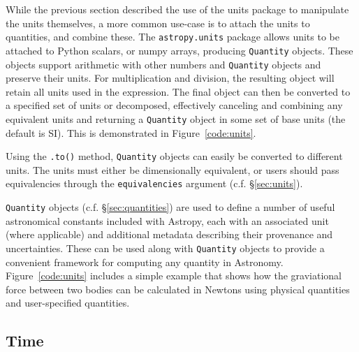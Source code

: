 \documentclass[traditabstract]{aa}
\begin{document}
\label{sec:quantities}

While the previous section described the use of the units package to
manipulate the units themselves, a more common use-case is to attach the units
to quantities, and combine these. The \texttt{astropy.units} package allows
units to be attached to Python scalars, or \gls{numpy} arrays, producing
\texttt{Quantity} objects. These objects support arithmetic with other numbers
and \texttt{Quantity} objects and preserve their units. For multiplication and
division, the resulting object will retain all units used in the expression.
The final object can then be converted to a specified set of units or
decomposed, effectively canceling and combining any equivalent units and
returning a \texttt{Quantity} object in some set of base units (the default is
SI). This is demonstrated in Figure~\ref{code:units}.

Using the \texttt{.to()} method, \texttt{Quantity} objects can easily be
converted to different units. The units must either be dimensionally
equivalent, or users should pass equivalencies through the
\texttt{equivalencies} argument (c.f. \S\ref{sec:units}).

\texttt{Quantity} objects (c.f. \S\ref{sec:quantities}) are used to define a
number of useful astronomical constants included with Astropy, each with an
associated unit (where applicable) and additional metadata describing their
provenance and uncertainties. These can be used along with \texttt{Quantity}
objects to provide a convenient framework for computing any quantity in
Astronomy. Figure~\ref{code:units} includes a simple example that shows how
the graviational force between two bodies can be calculated in Newtons using
physical quantities and user-specified quantities.

\subsection{Time}

\end{document}

